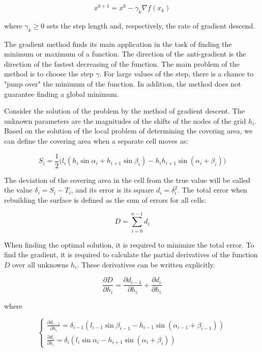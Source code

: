 \documentclass[
11pt,%
tightenlines,%
twoside,%
onecolumn,%
nofloats,%
nobibnotes,%
nofootinbib,%
superscriptaddress,%
noshowpacs,%
centertags]%
{revtex4}
\begin{document}
\begin{equation}
x^{k+1} = x^k - \gamma _k \nabla f(x_k)
\end{equation}

where $\gamma _k \geq 0$ sets the step length and, respectively, the rate of gradient descend.

The gradient method finds its main application in the task of finding the minimum or maximum of a function.
The direction of the anti-gradient is the direction of the fastest decreasing of the function.
The main problem of the method is to choose the step $\gamma$.
For large values of the step, there is a chance to "jump over" the minimum of the function.
In addition, the method does not guarantee finding a global minimum.

Consider the solution of the problem by the method of gradient descent.
The unknown parameters are the magnitudes of the shifts of the nodes of the grid $h_i$.
Based on the solution of the local problem of determining the covering area, we can define the covering area when a separate cell moves as:

\begin{equation}
S_i = \frac{1}{2}\big(l_i(h_i \sin \alpha_i + h_{i + 1} \sin \beta_i) - h_ih_{i + 1} \sin(\alpha_i + \beta_i)\big) 
\end{equation}

The deviation of the covering area in the cell from the true value will be called the value $\delta_i = S_i - T_i$, and its error is its square $d_i = \delta_i^2$.
The total error when rebuilding the surface is defined as the sum of errors for all cells:

\begin{equation}
D = \sum_{i = 0}^{n - 1}{d_i}
\end{equation}

When finding the optimal solution, it is required to minimize the total error.
To find the gradient, it is required to calculate the partial derivatives of the function $D$ over all unknowns $h_i$.
These derivatives can be written explicitly.

\begin{equation}
\frac{\partial D}{\partial h_i} = \frac{\partial d_{i - 1}}{\partial h_i} + \frac{\partial d_i}{\partial h_i}
\end{equation}

where

\begin{equation}
\begin{cases}
\frac{\partial d_{i - 1}}{\partial h_i} = \delta_{i - 1}(l_{i - 1} \sin \beta_{i - 1} - h_{i - 1} \sin(\alpha_{i - 1} + \beta_{i - 1})) \\
\frac{\partial d_i}{\partial h_i} = \delta_i(l_i \sin \alpha_i - h_{i + 1} \sin(\alpha_i + \beta_i))
\end{cases}
\end{equation}
\end{document}
